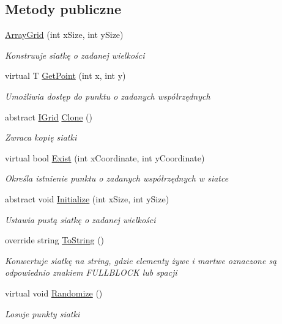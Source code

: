 \subsection*{Metody publiczne}
\begin{DoxyCompactItemize}
\item 
\hyperlink{class_convay_1_1_core_1_1_array_grid_af958573a897054ae4a946795082b3d5e}{Array\+Grid} (int x\+Size, int y\+Size)
\begin{DoxyCompactList}\small\item\em Konstruuje siatkę o zadanej wielkości \end{DoxyCompactList}\item 
virtual T \hyperlink{class_convay_1_1_core_1_1_array_grid_a9c0d58bccaf8fec674219fbcc8295e95}{Get\+Point} (int x, int y)
\begin{DoxyCompactList}\small\item\em Umożliwia dostęp do punktu o zadanych współrzędnych \end{DoxyCompactList}\item 
abstract \hyperlink{interface_convay_1_1_core_1_1_interfaces_1_1_i_grid}{I\+Grid} \hyperlink{class_convay_1_1_core_1_1_array_grid_a139eba7f8a6780b4ecbc446959e159ad}{Clone} ()
\begin{DoxyCompactList}\small\item\em Zwraca kopię siatki \end{DoxyCompactList}\item 
virtual bool \hyperlink{class_convay_1_1_core_1_1_array_grid_a90fc10f845bf94f334079751fc9c1cba}{Exist} (int x\+Coordinate, int y\+Coordinate)
\begin{DoxyCompactList}\small\item\em Określa istnienie punktu o zadanych współrzędnych w siatce \end{DoxyCompactList}\item 
abstract void \hyperlink{class_convay_1_1_core_1_1_array_grid_a49501f55af9f747ed75cb94563b6d641}{Initialize} (int x\+Size, int y\+Size)
\begin{DoxyCompactList}\small\item\em Ustawia pustą siatkę o zadanej wielkości \end{DoxyCompactList}\item 
override string \hyperlink{class_convay_1_1_core_1_1_array_grid_a8f64f748e08f32c2bf04ac1ec97f3e82}{To\+String} ()
\begin{DoxyCompactList}\small\item\em Konwertuje siatkę na string, gdzie elementy żywe i martwe oznaczone są odpowiednio znakiem F\+U\+L\+L\+B\+L\+O\+CK lub spacji \end{DoxyCompactList}\item 
virtual void \hyperlink{class_convay_1_1_core_1_1_array_grid_a0a40a1e8519368ecfcb1e1467a53e513}{Randomize} ()
\begin{DoxyCompactList}\small\item\em Losuje punkty siatki \end{DoxyCompactList}\end{DoxyCompactItemize}
